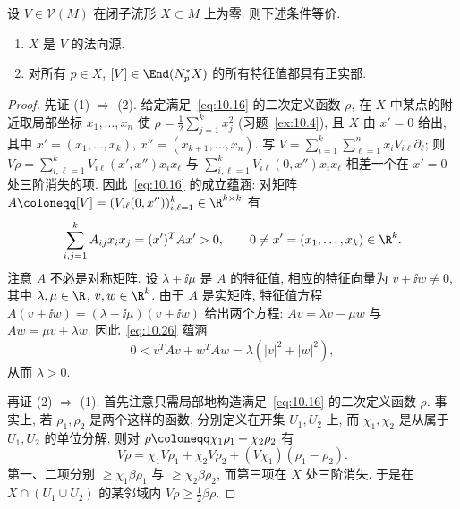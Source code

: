 \begin{lemma}[线性化与法向源]\label{lem:10.9}
设 $V \in \mathcal{V}(M)$ 在闭子流形 $X \subset M$ 上为零. 则下述条件等价.
\begin{enumerate}
    \item $X$ 是 $V$ 的法向源.
    \item 对所有 $p \in X$, $[V] \in \End(N_p^* X)$ 的所有特征值都具有正实部.
\end{enumerate}
\end{lemma}

\begin{proof}
先证 (1) $\Rightarrow$ (2). 给定满足~\eqref{eq:10.16} 的二次定义函数 $\rho$, 在 $X$ 中某点的附近取局部坐标 $x_1, \ldots, x_n$ 使 $\rho = \frac{1}{2}\sum_{j=1}^{k} x_j^2$ (习题~\ref{ex:10.4}), 且 $X$ 由 $x' = 0$ 给出, 其中 $x' = (x_1, \ldots, x_k)$, $x'' = (x_{k+1}, \ldots, x_n)$. 写 $V = \sum_{i=1}^{k}\sum_{\ell=1}^{n} x_i V_{i\ell} \partial_\ell$; 则 $V\rho = \sum_{i,\ell=1}^{k} V_{i\ell}(x', x'') x_i x_\ell$ 与 $\sum_{i,\ell=1}^{k} V_{i\ell}(0, x'') x_i x_\ell$ 相差一个在 $x' = 0$ 处三阶消失的项. 因此~\eqref{eq:10.16} 的成立蕴涵: 对矩阵 $A \defeq [V] = (V_{i\ell}(0, x''))_{i,\ell=1}^{k} \in \R^{k \times k}$ 有
\begin{equation}\label{eq:10.26}
    \sum_{i,j=1}^{k} A_{ij} x_i x_j = (x')^T A x' > 0, \qquad 0 \neq x' = (x_1, \ldots, x_k) \in \R^k.
\end{equation}
注意 $A$ 不必是对称矩阵. 设 $\lambda + \ii\mu$ 是 $A$ 的特征值, 相应的特征向量为 $v + \ii w \neq 0$, 其中 $\lambda, \mu \in \R$, $v, w \in \R^k$. 由于 $A$ 是实矩阵, 特征值方程 $A(v + \ii w) = (\lambda + \ii\mu)(v + \ii w)$ 给出两个方程: $A v = \lambda v - \mu w$ 与 $A w = \mu v + \lambda w$. 因此~\eqref{eq:10.26} 蕴涵
\begin{equation}\label{eq:10.27}
    0 < v^T A v + w^T A w = \lambda(|v|^2 + |w|^2),
\end{equation}
从而 $\lambda > 0$.

再证 (2) $\Rightarrow$ (1). 首先注意只需局部地构造满足~\eqref{eq:10.16} 的二次定义函数 $\rho$. 事实上, 若 $\rho_1, \rho_2$ 是两个这样的函数, 分别定义在开集 $U_1, U_2$ 上, 而 $\chi_1, \chi_2$ 是从属于 $U_1, U_2$ 的单位分解, 则对 $\rho \defeq \chi_1 \rho_1 + \chi_2 \rho_2$ 有
\begin{equation}\label{eq:10.28}
    V\rho = \chi_1 V\rho_1 + \chi_2 V\rho_2 + (V\chi_1)(\rho_1 - \rho_2).
\end{equation}
第一、二项分别 $\ge \chi_1 \beta \rho_1$ 与 $\ge \chi_2 \beta \rho_2$, 而第三项在 $X$ 处三阶消失. 于是在 $X \cap (U_1 \cup U_2)$ 的某邻域内 $V\rho \ge \frac{1}{2}\beta\rho$.


\end{proof}
